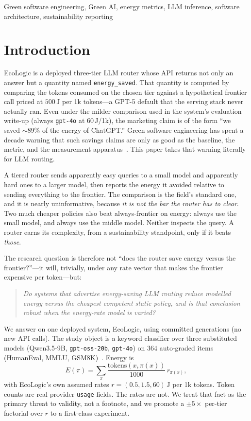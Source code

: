 \documentclass[10pt,conference]{IEEEtran}
\begin{document}
\begin{IEEEkeywords}
Green software engineering, Green AI, energy metrics, LLM inference, software architecture, sustainability reporting
\end{IEEEkeywords}

\section{Introduction}

EcoLogic is a deployed three-tier LLM router whose API returns not only an answer but a quantity named \texttt{energy\_saved}. That quantity is computed by comparing the tokens consumed on the chosen tier against a hypothetical frontier call priced at $500$\,J per 1k tokens---a GPT-5 default that the serving stack never actually ran. Even under the milder comparison used in the system's evaluation write-up (always \texttt{gpt-4o} at $60$\,J/1k), the marketing claim is of the form ``we saved $\sim$89\% of the energy of ChatGPT.'' Green software engineering has spent a decade warning that such savings claims are only as good as the baseline, the metric, and the measurement apparatus~\cite{naumann2011greensoft,lago2015framing,schwartz2020green,calero2021green}. This paper takes that warning literally for LLM routing.

A tiered router sends apparently easy queries to a small model and apparently hard ones to a larger model, then reports the energy it avoided relative to sending everything to the frontier. The comparison is the field's standard one, and it is nearly uninformative, because \emph{it is not the bar the router has to clear}. Two much cheaper policies also beat always-frontier on energy: always use the small model, and always use the middle model. Neither inspects the query. A router earns its complexity, from a sustainability standpoint, only if it beats \emph{those}.

The research question is therefore not ``does the router save energy versus the frontier?''---it will, trivially, under any rate vector that makes the frontier expensive per token---but:

\begin{quote}
\emph{Do systems that advertise energy-saving LLM routing reduce modelled energy versus the cheapest competent static policy, and is that conclusion robust when the energy-rate model is varied?}
\end{quote}

We answer on one deployed system, EcoLogic, using committed generations (no new API calls). The study object is a keyword classifier over three substituted models (Qwen3.5-9B, \texttt{gpt-oss-20b}, \texttt{gpt-4o}) on $364$ auto-graded items (HumanEval, MMLU, GSM8K)~\cite{chen2021evaluating,hendrycks2021mmlu,cobbe2021gsm8k}. Energy is
\[
E(\pi)=\sum_{x}\frac{\mathrm{tokens}(x,\pi(x))}{1000}\,r_{\pi(x)},
\]
with EcoLogic's own assumed rates $r=(0.5,1.5,60)$\,J per 1k tokens. Token counts are real provider \texttt{usage} fields. The rates are not. We treat that fact as the primary threat to validity, not a footnote, and we promote a $\pm5\times$ per-tier factorial over $r$ to a first-class experiment.
\end{document}

